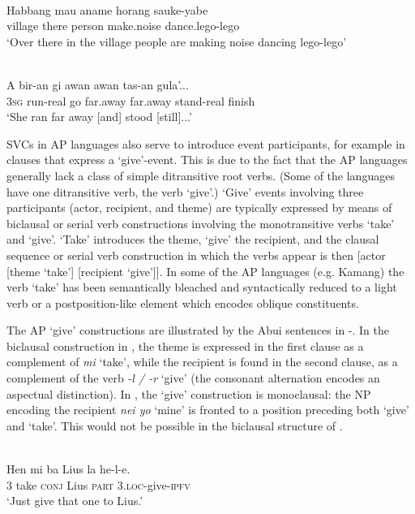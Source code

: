 \ea%
\label{ex:1:26}
\\
\gll Habbang  mau  aname  horang  sauke-yabe \\
village  there  person  make.noise  dance.lego-lego   \\
\glt `Over there in the village people are making noise dancing lego-lego'
\z
 


\ea%
\label{ex:1:27}
 \\
\gll A   bir-an  gi  awan  awan  tas-an  gula'... \\
 3\textsc{sg}  run-real   go  far.away  far.away  stand-real  finish  \\
\glt `She ran far away [and] stood [still]...'  
\z
 

SVCs in AP languages also serve to introduce event participants, for example in clauses that express a `give'-event. This is due to the fact that the AP languages generally lack a class of simple ditransitive root verbs. (Some of the languages have one ditransitive verb, the verb `give'.) `Give' events involving three participants (actor, recipient, and theme) are typically expressed by means of biclausal or serial verb constructions involving the monotransitive verbs `take' and `give'. `Take' introduces the theme, `give' the recipient, and the clausal sequence or serial verb construction in which the verbs appear is then [actor [theme `take'] [recipient `give']]. In some of the AP languages (e.g. Kamang) the verb `take' has been semantically bleached and syntactically reduced to a light verb or a postposition-like element which encodes oblique constituents.

The AP `give' constructions are illustrated by the Abui sentences in -. In the biclausal construction in , the theme is expressed in the first clause as a complement of \textit{mi} `take', while the recipient is found in the second clause, as a complement of the verb \textit{{}-l / -r} `give' (the consonant alternation encodes an aspectual distinction). In , the `give' construction is monoclausal: the NP encoding the recipient \textit{nei yo} `mine' is fronted to a position preceding both `give' and `take'. This would not be possible in the biclausal structure of .



\ea%
\label{ex:1:28}
   \\
\gll Hen  mi  ba  Lius  la   he-l-e. \\
3  take  \textsc{conj} Lius  \textsc{part} 3.\textsc{loc}{}-give-\textsc{ipfv}   \\
\glt `Just give that one to Lius.' 
\z









